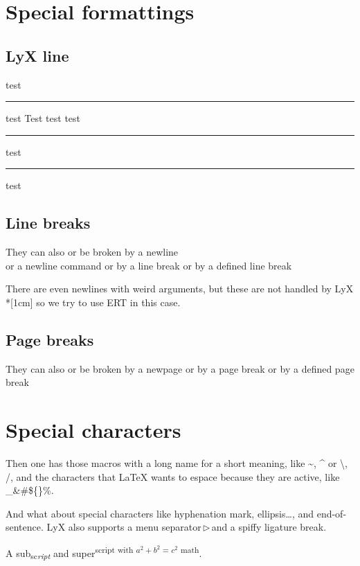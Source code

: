 \documentclass[a4paper,12pt]{article}
\providecommand{\printnomenclature}{\printglossary}
\newcommand{\lyxline}[1][1pt]{%
  \par\noindent%
  \rule[.5ex]{\linewidth}{#1}\par}
\newcommand{\lyxarrow}{\leavevmode\,$\triangleright$\,\allowbreak}
\begin{document}
\section{Special formattings}

\subsection{LyX line}

test

{\tiny \lyxline{\tiny}}{\tiny \par}

test {\Huge Test} {\tiny test} test

\lyxline{\normalsize}

test

{\Huge \lyxline{\Huge}}{\Huge \par}

test

\subsection{Line breaks}

They can also or be broken by a newline\\
or a newline command \newline
or by a line break \linebreak
or by a defined line break \linebreak[4]

There are even newlines with weird arguments, but these are not
handled by LyX\\*[1cm]
so we try to use ERT in this case.

\subsection{Page breaks}

They can also or be broken by a newpage \newpage
or by a page break \pagebreak
or by a defined page break \pagebreak[4]

\section{Special characters}

Then one has those macros with a long name for a short meaning, like
\textasciitilde, \textasciicircum{} or \textbackslash{}, \slash{},
\nobreakdash and the characters
that LaTeX wants to espace because they are active, like \_\&\#\$\{\}\%.

And what about special characters like hyphe\-nation mark,
ellipsis\ldots, and end-of-sentence\@. LyX also supports a menu
separator\lyxarrow{}and a spif\textcompwordmark{}fy ligature break.

A sub\textsubscript{sc\emph{ript}} and super\textsuperscript{script
with $a^2+b^2=c^2$ math}.

\printindex{}

\printnomenclature{}
\end{document}
